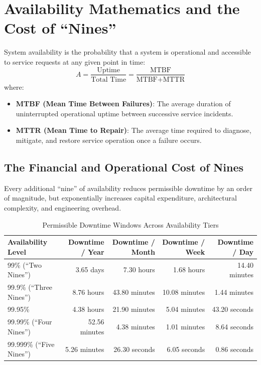 \section{Availability Mathematics and the Cost of ``Nines''}

System availability is the probability that a system is operational and accessible to service requests at any given point in time:
\begin{equation}
A = \frac{\text{Uptime}}{\text{Total Time}} = \frac{\text{MTBF}}{\text{MTBF} + \text{MTTR}}
\end{equation}
where:
\begin{itemize}[leftmargin=18pt]
  \item \textbf{MTBF (Mean Time Between Failures)}: The average duration of uninterrupted operational uptime between successive service incidents.
  \item \textbf{MTTR (Mean Time to Repair)}: The average time required to diagnose, mitigate, and restore service operation once a failure occurs.
\end{itemize}

\subsection{The Financial and Operational Cost of Nines}

Every additional ``nine'' of availability reduces permissible downtime by an order of magnitude, but exponentially increases capital expenditure, architectural complexity, and engineering overhead.

\begin{table}[htbp]
\centering\small
\begin{tabular}{lrrrr}
\toprule
\textbf{Availability Level} & \textbf{Downtime / Year} & \textbf{Downtime / Month} & \textbf{Downtime / Week} & \textbf{Downtime / Day} \\
\midrule
99\% (``Two Nines'') & 3.65 days & 7.30 hours & 1.68 hours & 14.40 minutes \\
99.9\% (``Three Nines'') & 8.76 hours & 43.80 minutes & 10.08 minutes & 1.44 minutes \\
99.95\% & 4.38 hours & 21.90 minutes & 5.04 minutes & 43.20 seconds \\
99.99\% (``Four Nines'') & 52.56 minutes & 4.38 minutes & 1.01 minutes & 8.64 seconds \\
99.999\% (``Five Nines'') & 5.26 minutes & 26.30 seconds & 6.05 seconds & 0.86 seconds \\
\bottomrule
\end{tabular}
\caption{Permissible Downtime Windows Across Availability Tiers}
\label{tab:availability-nines}
\end{table}


